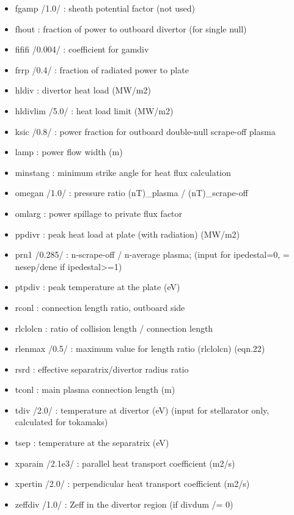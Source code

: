 \documentclass[]{article}
\begin{document}
\begin{itemize}
\begin{itemize}
  \item
    fgamp /1.0/ : sheath potential factor (not used)
  \item
    fhout : fraction of power to outboard divertor (for single null)
  \item
    fififi /0.004/ : coefficient for gamdiv
  \item
    frrp /0.4/ : fraction of radiated power to plate
  \item
    hldiv : divertor heat load (MW/m2)
  \item
    hldivlim /5.0/ : heat load limit (MW/m2)
  \item
    ksic /0.8/ : power fraction for outboard double-null scrape-off
    plasma
  \item
    lamp : power flow width (m)
  \item
    minstang : minimum strike angle for heat flux calculation
  \item
    omegan /1.0/ : pressure ratio (nT)\_plasma / (nT)\_scrape-off
  \item
    omlarg : power spillage to private flux factor
  \item
    ppdivr : peak heat load at plate (with radiation) (MW/m2)
  \item
    prn1 /0.285/ : n-scrape-off / n-average plasma; (input for
    ipedestal=0, = nesep/dene if ipedestal\textgreater{}=1)
  \item
    ptpdiv : peak temperature at the plate (eV)
  \item
    rconl : connection length ratio, outboard side
  \item
    rlclolcn : ratio of collision length / connection length
  \item
    rlenmax /0.5/ : maximum value for length ratio (rlclolcn) (eqn.22)
  \item
    rsrd : effective separatrix/divertor radius ratio
  \item
    tconl : main plasma connection length (m)
  \item
    tdiv /2.0/ : temperature at divertor (eV) (input for stellarator
    only, calculated for tokamaks)
  \item
    tsep : temperature at the separatrix (eV)
  \item
    xparain /2.1e3/ : parallel heat transport coefficient (m2/s)
  \item
    xpertin /2.0/ : perpendicular heat transport coefficient (m2/s)
  \item
    zeffdiv /1.0/ : Zeff in the divertor region (if divdum /= 0)
  \end{itemize}


\end{itemize}
\end{document}
